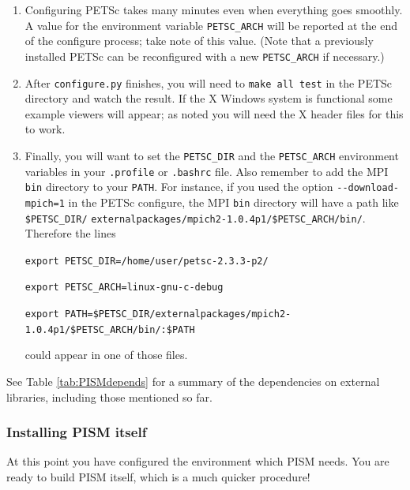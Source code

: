 \documentclass[11pt,final]{amsart}
\begin{document}
\begin{enumerate}
\begin{enumerate}
\item  Configuring PETSc takes many minutes even when everything goes smoothly.   A value for the environment variable \verb|PETSC_ARCH| will be reported at the end of the configure process; take note of this value.  (Note that a previously installed PETSc can be reconfigured with a new \verb|PETSC_ARCH| if necessary.)

\item  After \verb|configure.py| finishes, you will need to \verb|make all test| in the PETSc directory and watch the result.  If the X Windows system is functional some example viewers will appear; as noted you will need the X header files for this to work.

\item Finally, you will want to set the \verb|PETSC_DIR| and the \verb|PETSC_ARCH| environment variables in your \verb|.profile| or \verb|.bashrc| file.  Also remember to add the MPI \verb|bin| directory to your \verb|PATH|.  For instance, if you used the option \verb|--download-mpich=1| in the PETSc configure, the MPI \verb|bin| directory will have a path like \verb|$PETSC_DIR/| \verb|externalpackages/mpich2-1.0.4p1/$PETSC_ARCH/bin/|.  Therefore the lines 

\small
\verb|export PETSC_DIR=/home/user/petsc-2.3.3-p2/|

\verb|export PETSC_ARCH=linux-gnu-c-debug|

\verb|export PATH=$PETSC_DIR/externalpackages/mpich2-1.0.4p1/$PETSC_ARCH/bin/:$PATH|
\normalsize

\noindent could appear in one of those files.
\end{enumerate}
\end{enumerate}

\medskip
See Table \ref{tab:PISMdepends} for a summary of the dependencies on external libraries, including those mentioned so far.


\subsubsection*{Installing PISM itself}
At this point you have configured the environment which PISM needs.  You are ready to build PISM itself, which is a much quicker procedure!
\end{document}
